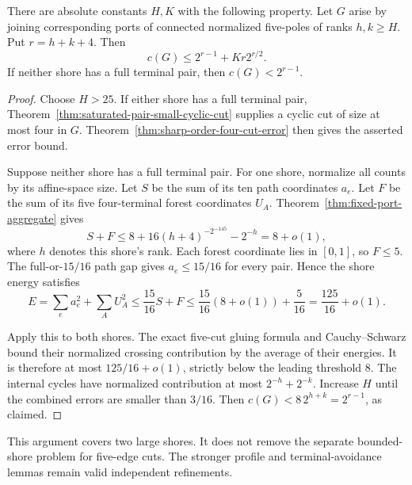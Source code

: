 \begin{corollary}
\label{cor:five-cut-large-shores-saturation-shortcut}
There are absolute constants $H,K$ with the following property.
Let $G$ arise by joining corresponding ports of connected normalized five-poles of ranks $h,k\ge H$.
Put $r=h+k+4$.
Then
\[
 c(G)\le2^{r-1}+Kr2^{r/2}.
\]
If neither shore has a full terminal pair, then $c(G)<2^{r-1}$.
\end{corollary}

\begin{proof}
Choose $H>25$.
If either shore has a full terminal pair, Theorem~\ref{thm:saturated-pair-small-cyclic-cut} supplies a cyclic cut of size at most four in $G$.
Theorem~\ref{thm:sharp-order-four-cut-error} then gives the asserted error bound.

Suppose neither shore has a full terminal pair.
For one shore, normalize all counts by its affine-space size.
Let $S$ be the sum of its ten path coordinates $a_e$.
Let $F$ be the sum of its five four-terminal forest coordinates $U_A$.
Theorem~\ref{thm:fixed-port-aggregate} gives
\[
 S+F\le8+16(h+4)^{-2^{-145}}-2^{-h}=8+o(1),
\]
where $h$ denotes this shore's rank.
Each forest coordinate lies in $[0,1]$, so $F\le5$.
The full-or-$15/16$ path gap gives $a_e\le15/16$ for every pair.
Hence the shore energy satisfies
\[
 E=\sum_e a_e^2+\sum_A U_A^2
 \le\frac{15}{16}S+F
 \le\frac{15}{16}(8+o(1))+\frac5{16}
 =\frac{125}{16}+o(1).
\]

Apply this to both shores.
The exact five-cut gluing formula and Cauchy--Schwarz bound their normalized crossing contribution by the average of their energies.
It is therefore at most $125/16+o(1)$, strictly below the leading threshold $8$.
The internal cycles have normalized contribution at most $2^{-h}+2^{-k}$.
Increase $H$ until the combined errors are smaller than $3/16$.
Then $c(G)<8\,2^{h+k}=2^{r-1}$, as claimed.
\end{proof}

This argument covers two large shores.
It does not remove the separate bounded-shore problem for five-edge cuts.
The stronger profile and terminal-avoidance lemmas remain valid independent refinements.
